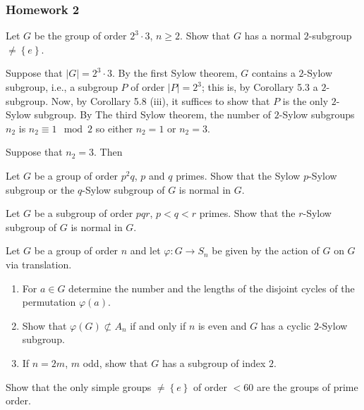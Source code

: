 \subsubsection{Homework 2}
\setcounter{exercise}{0}

\begin{problem}
  Let $G$ be the group of order $2^3\cdot 3$, $n\geq 2$. Show that $G$ has
  a normal $2$-subgroup $\neq\left\{e\right\}$.
\end{problem}
\begin{solution}
  Suppose that $|G|=2^3\cdot 3$. By the first Sylow theorem, $G$ contains a
  $2$-Sylow subgroup, i.e., a subgroup $P$ of order $|P|=2^3$; this is, by
  Corollary 5.3 a $2$-subgroup. Now, by Corollary 5.8 (iii), it suffices to
  show that $P$ is the only $2$-Sylow subgroup. By The third Sylow theorem,
  the number of $2$-Sylow subgroups $n_2$ is $n_2\equiv 1\mod 2$ so either
  $n_2=1$ or $n_2=3$.

  Suppose that $n_2=3$. Then
\end{solution}

\begin{problem}
  Let $G$ be a group of order $p^2q$, $p$ and $q$ primes. Show that the
  Sylow $p$-Sylow subgroup or the $q$-Sylow subgroup of $G$ is normal in
  $G$.
\end{problem}
\begin{solution}
\end{solution}

\begin{problem}
  Let $G$ be a subgroup of order $pqr$, $p<q<r$ primes. Show that the
  $r$-Sylow subgroup of $G$ is normal in $G$.
\end{problem}
\begin{solution}
\end{solution}

\begin{problem}
  Let $G$ be a group of order $n$ and let $\varphi\colon G\to S_n$ be given
  by the action of $G$ on $G$ via translation.
  \begin{enumerate}[label=(\alph*),noitemsep]
  \item For $a\in G$ determine the number and the lengths of the disjoint
    cycles of the permutation $\varphi(a)$.
  \item Show that $\varphi(G)\nsubset A_n$ if and only if $n$ is even and
    $G$ has a cyclic $2$-Sylow subgroup.
  \item If $n=2m$, $m$ odd, show that $G$ has a subgroup of index $2$.
  \end{enumerate}
\end{problem}
\begin{solution}
\end{solution}

\begin{problem}
  Show that the only simple groups $\neq\left\{e\right\}$ of order $<60$
  are the groups of prime order.
\end{problem}
\begin{solution}
\end{solution}

